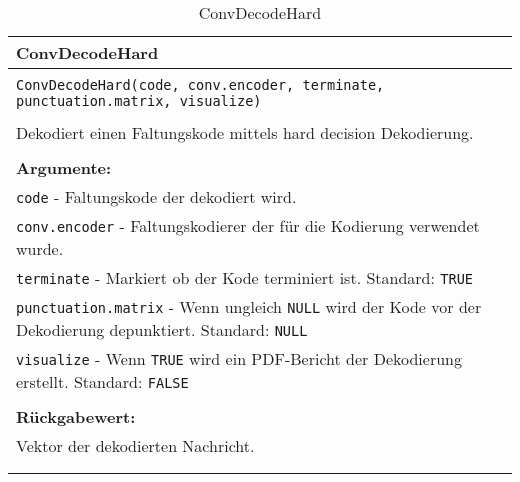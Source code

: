 \begin{longtable}{|p{\textwidth}|}
\hline
\rowcolor{lightblue}
ConvDecodeHard
\\
\hline
\\
\texttt{ConvDecodeHard(code, conv.encoder, terminate, punctuation.matrix, visualize)}\\
\\
Dekodiert einen Faltungskode mittels hard decision Dekodierung.\\
\\
\textbf{Argumente:}\\
\texttt{code} - Faltungskode der dekodiert wird.\\
\texttt{conv.encoder} - Faltungskodierer der für die Kodierung verwendet wurde.\\
\texttt{terminate} - Markiert ob der Kode terminiert ist. Standard: \texttt{TRUE}\\
\texttt{punctuation.matrix} - Wenn ungleich \texttt{NULL} wird der Kode vor der Dekodierung depunktiert. Standard: \texttt{NULL}\\
\texttt{visualize} - Wenn \texttt{TRUE} wird ein PDF-Bericht der Dekodierung erstellt. Standard: \texttt{FALSE}\\
\\
\textbf{Rückgabewert:}\\
Vektor der dekodierten Nachricht.\\
\\
\hline
\caption{ConvDecodeHard}
\label{funktion:ConvDecodeHard}
\end{longtable}